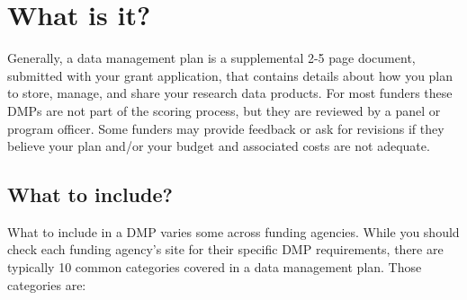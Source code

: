 \documentclass[
]{book}
\begin{document}
\hypertarget{what-is-it}{%
\section{What is it?}\label{what-is-it}}

Generally, a data management plan is a supplemental 2-5 page document, submitted with your grant application, that contains details about how you plan to store, manage, and share your research data products. For most funders these DMPs are not part of the scoring process, but they are reviewed by a panel or program officer. Some funders may provide feedback or ask for revisions if they believe your plan and/or your budget and associated costs are not adequate.

\hypertarget{what-to-include}{%
\subsection{What to include?}\label{what-to-include}}

What to include in a DMP varies some across funding agencies. While you should check each funding agency's site for their specific DMP requirements, there are typically 10 common categories covered in a data management plan. Those categories are:
\end{document}

